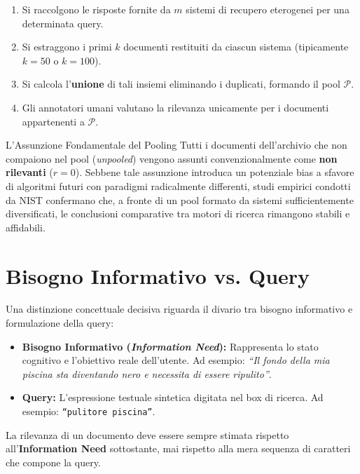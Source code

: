 \begin{enumerate}
    \item Si raccolgono le risposte fornite da $m$ sistemi di recupero eterogenei per una determinata query.
    \item Si estraggono i primi $k$ documenti restituiti da ciascun sistema (tipicamente $k = 50$ o $k = 100$).
    \item Si calcola l'\textbf{unione} di tali insiemi eliminando i duplicati, formando il pool $\mathcal{P}$.
    \item Gli annotatori umani valutano la rilevanza unicamente per i documenti appartenenti a $\mathcal{P}$.
\end{enumerate}

\begin{alertblock}{L'Assunzione Fondamentale del Pooling}
Tutti i documenti dell'archivio che non compaiono nel pool (\textit{unpooled}) vengono assunti convenzionalmente come \textbf{non rilevanti} ($r = 0$).
Sebbene tale assunzione introduca un potenziale bias a sfavore di algoritmi futuri con paradigmi radicalmente differenti, studi empirici condotti da NIST confermano che, a fronte di un pool formato da sistemi sufficientemente diversificati, le conclusioni comparative tra motori di ricerca rimangono stabili e affidabili.
\end{alertblock}

\FloatBarrier
\section{Bisogno Informativo vs. Query}

Una distinzione concettuale decisiva riguarda il divario tra bisogno informativo e formulazione della query:
\begin{itemize}
    \item \textbf{Bisogno Informativo (\textit{Information Need}):} Rappresenta lo stato cognitivo e l'obiettivo reale dell'utente. Ad esempio: \textit{``Il fondo della mia piscina sta diventando nero e necessita di essere ripulito''}.
    \item \textbf{Query:} L'espressione testuale sintetica digitata nel box di ricerca. Ad esempio: \texttt{``pulitore piscina''}.
\end{itemize}
\begin{property}
La rilevanza di un documento deve essere sempre stimata rispetto all'\textbf{Information Need} sottostante, mai rispetto alla mera sequenza di caratteri che compone la query.
\end{property}

